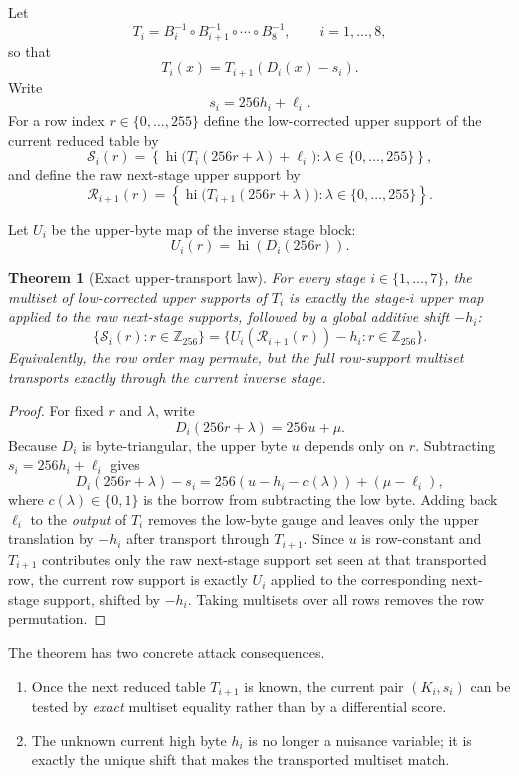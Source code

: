 \documentclass[11pt]{article}
\newtheorem{theorem}{Theorem}
\begin{document}
Let
\[
T_i = B_i^{-1}\circ B_{i+1}^{-1}\circ\cdots\circ B_8^{-1},
\qquad i=1,\dots,8,
\]
so that
\[
T_i(x)=T_{i+1}(D_i(x)-s_i).
\]
Write
\[
s_i = 256h_i + \ell_i.
\]
For a row index $r\in\{0,\dots,255\}$ define the low-corrected upper support of the current reduced table by
\[
\mathcal{S}_i(r)=
\left\{
\operatorname{hi}\bigl(T_i(256r+\lambda)+\ell_i\bigr)
:\lambda\in\{0,\dots,255\}
\right\},
\]
and define the raw next-stage upper support by
\[
\mathcal{R}_{i+1}(r)=
\left\{
\operatorname{hi}\bigl(T_{i+1}(256r+\lambda)\bigr)
:\lambda\in\{0,\dots,255\}
\right\}.
\]

Let $U_i$ be the upper-byte map of the inverse stage block:
\[
U_i(r)=\operatorname{hi}(D_i(256r)).
\]

\begin{theorem}[Exact upper-transport law]
For every stage $i\in\{1,\dots,7\}$, the multiset of low-corrected upper supports of $T_i$ is exactly the stage-$i$ upper map applied to the raw next-stage supports, followed by a global additive shift $-h_i$:
\[
\bigl\{\mathcal{S}_i(r):r\in\mathbb{Z}_{256}\bigr\}
=
\bigl\{U_i(\mathcal{R}_{i+1}(r))-h_i:r\in\mathbb{Z}_{256}\bigr\}.
\]
Equivalently, the row order may permute, but the full row-support multiset transports exactly through the current inverse stage.
\end{theorem}

\begin{proof}
For fixed $r$ and $\lambda$, write
\[
D_i(256r+\lambda)=256u+\mu.
\]
Because $D_i$ is byte-triangular, the upper byte $u$ depends only on $r$. Subtracting $s_i=256h_i+\ell_i$ gives
\[
D_i(256r+\lambda)-s_i = 256(u-h_i-c(\lambda)) + (\mu-\ell_i),
\]
where $c(\lambda)\in\{0,1\}$ is the borrow from subtracting the low byte. Adding back $\ell_i$ to the \emph{output} of $T_i$ removes the low-byte gauge and leaves only the upper translation by $-h_i$ after transport through $T_{i+1}$. Since $u$ is row-constant and $T_{i+1}$ contributes only the raw next-stage support set seen at that transported row, the current row support is exactly $U_i$ applied to the corresponding next-stage support, shifted by $-h_i$. Taking multisets over all rows removes the row permutation.
\end{proof}

The theorem has two concrete attack consequences.
\begin{enumerate}[label=(\roman*)]
\item Once the next reduced table $T_{i+1}$ is known, the current pair $(K_i,s_i)$ can be tested by \emph{exact} multiset equality rather than by a differential score.
\item The unknown current high byte $h_i$ is no longer a nuisance variable; it is exactly the unique shift that makes the transported multiset match.
\end{enumerate}
\end{document}
